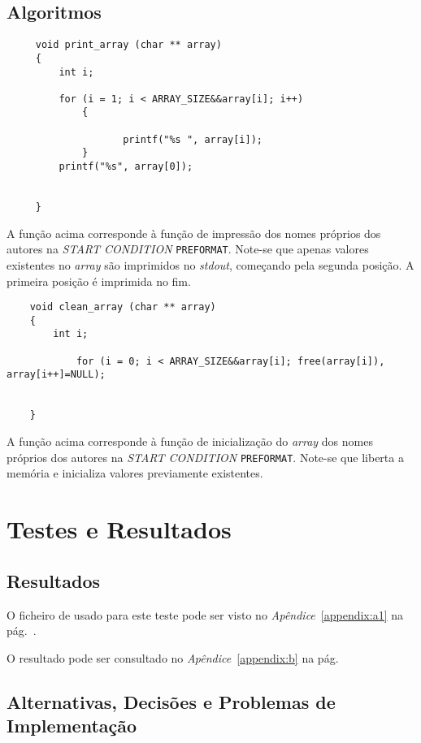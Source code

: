\subsection{Algoritmos}
\begin{Verbatim}
     void print_array (char ** array)
     {
         int i;
     	
         for (i = 1; i < ARRAY_SIZE&&array[i]; i++)
             {
     						
     	            printf("%s ", array[i]);
             }
         printf("%s", array[0]);
     										
     															
     }

\end{Verbatim}

A função acima corresponde à função de impressão dos nomes próprios dos autores
na \emph{START CONDITION} \texttt{PREFORMAT}. Note-se que apenas valores
existentes no \emph{array} são imprimidos no \emph{stdout}, começando pela
segunda posição. A primeira posição é imprimida no fim.

\begin{Verbatim}
	void clean_array (char ** array)
	{
	    int i;
		
			for (i = 0; i < ARRAY_SIZE&&array[i]; free(array[i]), array[i++]=NULL);
			
			
	}

\end{Verbatim}

A função acima corresponde à função de inicialização do \emph{array} dos nomes
próprios dos autores na \emph{START CONDITION} \texttt{PREFORMAT}. Note-se que
liberta a memória e inicializa valores previamente existentes.


\section{Testes e Resultados}
\subsection{Resultados}
\label{sec:ts:b1}

O ficheiro de usado para este teste pode ser visto no
\emph{Apêndice}~\ref{appendix:a1} na pág.~\pageref{appendix:a1}. 

O resultado pode ser consultado no \emph{Apêndice}~\ref{appendix:b} na
pág.~\pageref{appendix:b}

\subsection{Alternativas, Decisões e Problemas de Implementação}

